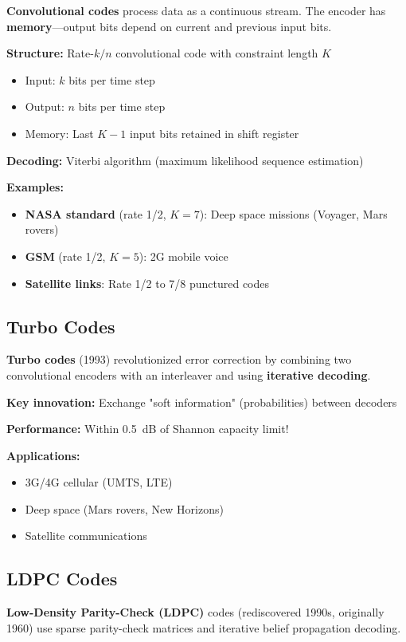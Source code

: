 \textbf{Convolutional codes} process data as a continuous stream. The encoder has \textbf{memory}---output bits depend on current and previous input bits.

\textbf{Structure:} Rate-$k/n$ convolutional code with constraint length $K$
\begin{itemize}
\item Input: $k$ bits per time step
\item Output: $n$ bits per time step
\item Memory: Last $K-1$ input bits retained in shift register
\end{itemize}

\textbf{Decoding:} Viterbi algorithm (maximum likelihood sequence estimation)

\textbf{Examples:}
\begin{itemize}
\item \textbf{NASA standard} (rate 1/2, $K=7$): Deep space missions (Voyager, Mars rovers)
\item \textbf{GSM} (rate 1/2, $K=5$): 2G mobile voice
\item \textbf{Satellite links}: Rate 1/2 to 7/8 punctured codes
\end{itemize}

\subsection{Turbo Codes}

\textbf{Turbo codes} (1993) revolutionized error correction by combining two convolutional encoders with an interleaver and using \textbf{iterative decoding}.

\textbf{Key innovation:} Exchange "soft information" (probabilities) between decoders

\textbf{Performance:} Within 0.5~dB of Shannon capacity limit!

\textbf{Applications:}
\begin{itemize}
\item 3G/4G cellular (UMTS, LTE)
\item Deep space (Mars rovers, New Horizons)
\item Satellite communications
\end{itemize}

\subsection{LDPC Codes}

\textbf{Low-Density Parity-Check (LDPC)} codes (rediscovered 1990s, originally 1960) use sparse parity-check matrices and iterative belief propagation decoding.

